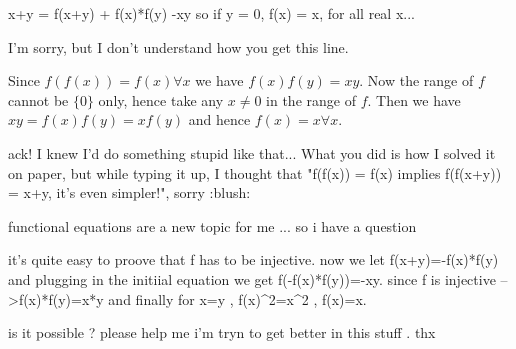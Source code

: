 \begin{solution}
	\begin{tcolorbox}x+y = f(x+y) + f(x)*f(y) -xy  so if y = 0, f(x) = x, for all real x...\end{tcolorbox}

I'm sorry, but I don't understand how you get this line.

Since $f(f(x)) = f(x) \forall x$ we have $f(x)f(y) = xy$.  Now the range of $f$ cannot be $\{0\}$ only, hence take any $x \neq 0$ in the range of $f$.  Then we have $xy = f(x)f(y) = xf(y)$ and hence $f(x) = x \forall x$.
\end{solution}



\begin{solution}
	ack! I knew I'd do something stupid like that...
What you did is how I solved it on paper, but while typing it up, I thought that "f(f(x)) = f(x) implies f(f(x+y)) = x+y, it's even simpler!", sorry  :blush:
\end{solution}



\begin{solution}
	functional equations are a new topic for me ... so i have a question 

it's quite easy to proove that f has to be injective.
now we let f(x+y)=-f(x)*f(y)
and plugging in the initiial equation we get f(-f(x)*f(y))=-xy.
since f is injective -->f(x)*f(y)=x*y
and finally for x=y , f(x)^2=x^2 , f(x)=x.

is it possible ? please help me i'm tryn to get better in this stuff . 
thx
\end{solution}



